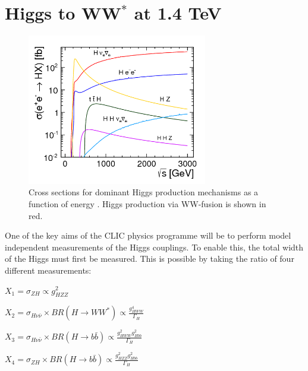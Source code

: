 \chapter{Higgs to WW$^*$ at 1.4 TeV}
\label{Higgs Analysis}

\begin{figure}
  \centering
  \includegraphics[width=0.7\textwidth,keepaspectratio]{Theory/fig/HiggsCrossSections}
  \caption[Cross Sections For Higgs Production Mechanisms]{Cross sections for dominant Higgs production mechanisms as a function of energy \cite{Abramowicz:2016zbo}. Higgs production via WW-fusion is shown in red.}
  \label{fig:higgsXSecs2}
\end{figure}

One of the key aims of the \ac{CLIC} physics programme will be to perform model independent measurements of the Higgs couplings. To enable this, the total width of the Higgs must first be measured. This is possible\cite{Durig:2014lfa} by taking the ratio of four different measurements:


\hspace{120pt}  $X_1=\sigma_{ZH} \propto g_{HZZ}^2$

\hspace{120pt}   $X_2=\sigma_{H\nu\bar{\nu}} \times BR(H\rightarrow WW^*) \propto \frac{g_{HWW}^4}{\Gamma_H}$

\hspace{120pt}   $X_3=\sigma_{H\nu\bar{\nu}} \times BR(H\rightarrow b\bar{b}) \propto \frac{g_{HWW}^{2}g_{Hbb}^2}{\Gamma_H}$

\hspace{120pt}   $X_4=\sigma_{ZH} \times BR(H\rightarrow b\bar{b}) \propto \frac{g_{HZZ}^{2}g_{Hbb}^2}{\Gamma_H}$



